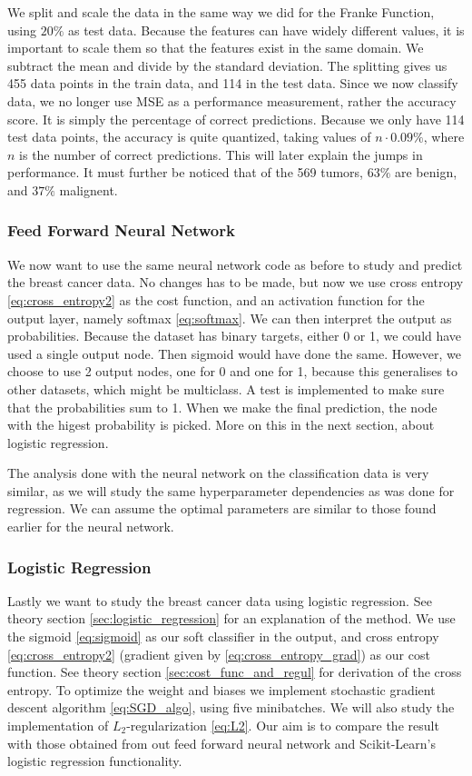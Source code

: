 \documentclass[12pt]{extarticle}
\begin{document}
We split and scale the data in the same way we did for the Franke Function, using $20\%$ as test data. Because the features can have widely different values, it is important to scale them so that the features exist in the same domain. We subtract the mean and divide by the standard deviation. The splitting gives us 455 data points in the train data, and 114 in the test data. Since we now classify data, we no longer use MSE as a performance measurement, rather the accuracy score. It is simply the percentage of correct predictions. Because we only have 114 test data points, the accuracy is quite quantized, taking values of $n\cdot 0.09\%$, where $n$ is the number of correct predictions. This will later explain the jumps in performance. It must further be noticed that of the 569 tumors, $63\%$ are benign, and $37\%$ malignent.

\subsubsection{Feed Forward Neural Network}
We now want to use the same neural network code as before to study and predict the breast cancer data. No changes has to be made, but now we use cross entropy \eqref{eq:cross_entropy2} as the cost function, and an activation function for the output layer, namely softmax \eqref{eq:softmax}. We can then interpret the output as probabilities. Because the dataset has binary targets, either 0 or 1, we could have used a single output node. Then sigmoid would have done the same. However, we choose to use 2 output nodes, one for 0 and one for 1, because this generalises to other datasets, which might be multiclass. A test is implemented to make sure that the probabilities sum to 1. When we make the final prediction, the node with the higest probability is picked. More on this in the next section, about logistic regression.


The analysis done with the neural network on the classification data is very similar, as we will study the same hyperparameter dependencies as was done for regression. We can assume the optimal parameters are similar to those found earlier for the neural network.

\subsubsection{Logistic Regression}
Lastly we want to study the breast cancer data using logistic regression. See theory section \ref{sec:logistic_regression} for an explanation of the method. We use the sigmoid \eqref{eq:sigmoid} as our soft classifier in the output, and cross entropy \eqref{eq:cross_entropy2} (gradient given by \eqref{eq:cross_entropy_grad}) as our cost function. See theory section \ref{sec:cost_func_and_regul} for derivation of the cross entropy. To optimize the weight and biases we implement stochastic gradient descent algorithm \eqref{eq:SGD_algo}, using five minibatches. We will also study the implementation of $L_2$-regularization \eqref{eq:L2}. Our aim is to compare the result with those obtained from out feed forward neural network and Scikit-Learn's logistic regression functionality.
\end{document}
